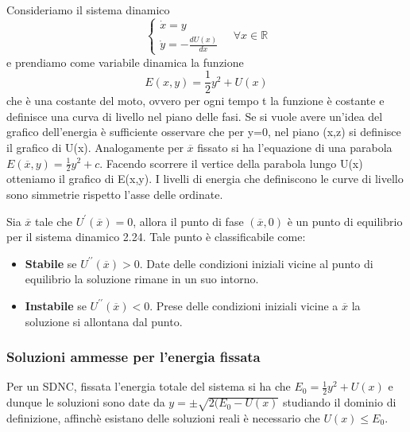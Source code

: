 Consideriamo il sistema dinamico 
\begin{equation}
		\left \{ \begin{array}{l}
		\dot{x} = y \\
		\dot{y} = - \frac{dU(x)}{dx}
	\end{array} \right.  \quad \forall x \in \mathbb{R}
\end{equation}
 e prendiamo come variabile dinamica la funzione 
 \begin{equation*}
 	E(x,y) = \frac{1}{2}y^2+ U(x)
 \end{equation*}
che \`{e} una costante del moto, ovvero per ogni tempo t la funzione \`{e} costante e definisce una curva di livello nel piano delle fasi. Se si vuole avere un'idea del grafico dell'energia \`{e} sufficiente osservare che per y=0, nel piano (x,z) si definisce il grafico di U(x). Analogamente per $\overline{x}$ fissato si ha l'equazione di una parabola $E(\overline{x},y) = \frac{1}{2}y^2 + c$. Facendo scorrere il vertice della parabola lungo U(x) otteniamo il grafico di E(x,y). \newline
I livelli di energia che definiscono  le curve di livello sono simmetrie rispetto l'asse delle ordinate.

\begin{definition}
	Sia $\overline{x}$ tale che $U^{\prime}(\overline{x}) = 0$, allora il punto di fase $(\overline{x},0)$ \`{e} un punto di equilibrio per il sistema dinamico 2.24. Tale punto \`{e} classificabile come:
	\begin{itemize}
		\item \textbf{Stabile} se $U^{\prime \prime} (\overline{x}) > 0$. Date delle condizioni iniziali vicine al punto di equilibrio la soluzione rimane in un suo intorno.
		\item \textbf{Instabile} se $U^{\prime \prime} (\overline{x}) < 0$. Prese delle condizioni iniziali vicine a $\overline{x}$ la soluzione si allontana dal punto.
	\end{itemize}
\end{definition}

\subsubsection{Soluzioni ammesse per l'energia fissata}

Per un SDNC, fissata l'energia totale del sistema si ha che $E_0 = \frac{1}{2}y^2 + U(x)$ e dunque le soluzioni sono date da $y = \pm \sqrt{2(E_0 - U(x)}$ studiando il dominio di definizione, affinch\`{e} esistano delle soluzioni reali \`{e} necessario che $U(x) \leq E_0$.

